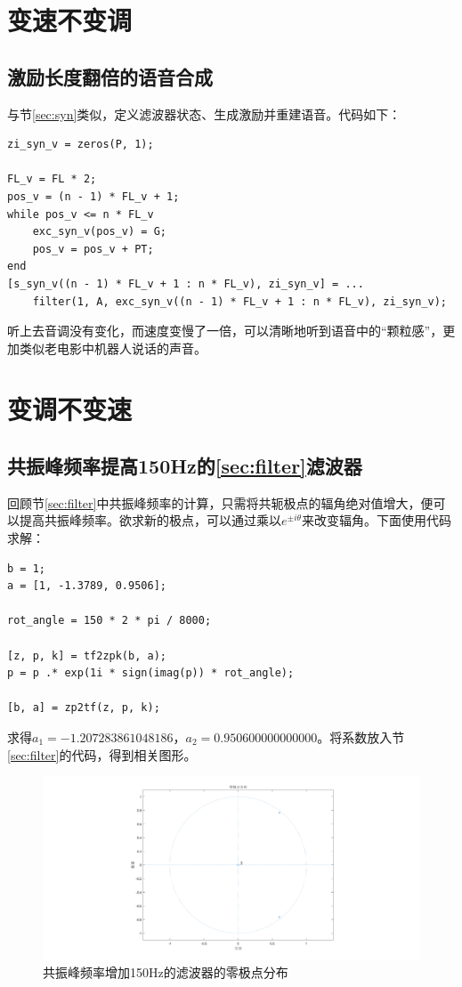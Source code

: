 \documentclass[10pt, a4paper]{article}
\begin{document}
\section{变速不变调}

\subsection{激励长度翻倍的语音合成}

与节\ref{sec:syn}类似，定义滤波器状态、生成激励并重建语音。代码如下：

\begin{verbatim}
zi_syn_v = zeros(P, 1);

FL_v = FL * 2;
pos_v = (n - 1) * FL_v + 1;
while pos_v <= n * FL_v
    exc_syn_v(pos_v) = G;
    pos_v = pos_v + PT;
end
[s_syn_v((n - 1) * FL_v + 1 : n * FL_v), zi_syn_v] = ...
    filter(1, A, exc_syn_v((n - 1) * FL_v + 1 : n * FL_v), zi_syn_v);
\end{verbatim}

听上去音调没有变化，而速度变慢了一倍，可以清晰地听到语音中的“颗粒感”，更加类似老电影中机器人说话的声音。

\section{变调不变速}

\subsection{共振峰频率提高150Hz的\ref{sec:filter}滤波器}

回顾节\ref{sec:filter}中共振峰频率的计算，只需将共轭极点的辐角绝对值增大，便可以提高共振峰频率。欲求新的极点，可以通过乘以$e^{\pm i\theta}$来改变辐角。下面使用代码求解：

\begin{verbatim}
b = 1;
a = [1, -1.3789, 0.9506];

rot_angle = 150 * 2 * pi / 8000;

[z, p, k] = tf2zpk(b, a);
p = p .* exp(1i * sign(imag(p)) * rot_angle);

[b, a] = zp2tf(z, p, k);
\end{verbatim}

求得$a_1 = -1.207283861048186$，$a_2 = 0.950600000000000$。将系数放入节\ref{sec:filter}的代码，得到相关图形。

\begin{figure}[h]
    \centering
    \includegraphics[width=.8\textwidth]{../assets/4_1_zplane.png}
    \caption{共振峰频率增加150Hz的滤波器的零极点分布}
    \label{fig:exp4_1_zplane}
\end{figure}
\end{document}
